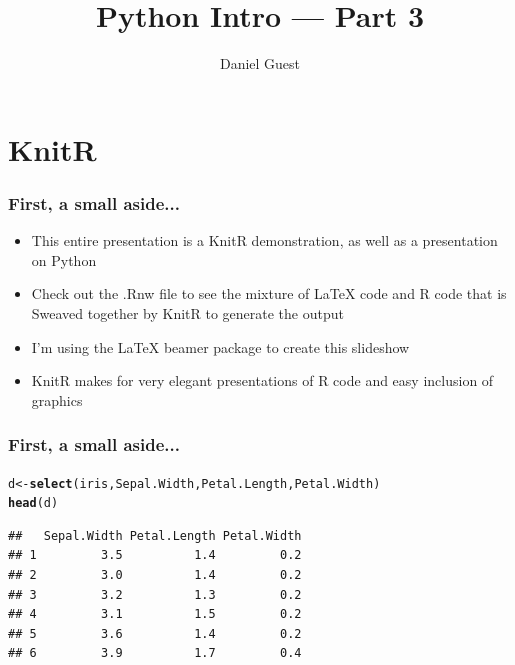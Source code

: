 \documentclass{beamer}\usepackage[]{graphicx}\usepackage[]{color}
\title{Python Intro --- Part 3}
\author{Daniel Guest}
\makeatletter
\newcommand{\hlstd}[1]{\textcolor[rgb]{0.345,0.345,0.345}{#1}}%
\newcommand{\hlkwb}[1]{\textcolor[rgb]{0.69,0.353,0.396}{#1}}%
\newcommand{\hlkwd}[1]{\textcolor[rgb]{0.737,0.353,0.396}{\textbf{#1}}}%
\newenvironment{kframe}{%
 \def\at@end@of@kframe{}%
 \ifinner\ifhmode%
  \def\at@end@of@kframe{\end{minipage}}%
  \begin{minipage}{\columnwidth}%
 \fi\fi%
 \def\FrameCommand##1{\hskip\@totalleftmargin \hskip-\fboxsep
 \colorbox{shadecolor}{##1}\hskip-\fboxsep
     \hskip-\linewidth \hskip-\@totalleftmargin \hskip\columnwidth}%
 \MakeFramed {\advance\hsize-\width
   \@totalleftmargin\z@ \linewidth\hsize
   \@setminipage}}%
 {\par\unskip\endMakeFramed%
 \at@end@of@kframe}
\newenvironment{knitrout}{}{} %
\makeatother
\begin{document}
\maketitle

\tableofcontents

\section{KnitR}

\begin{frame}[fragile]
\frametitle{First, a small aside...}
\begin{itemize}
	\item This entire presentation is a KnitR demonstration, as well as a presentation on Python

	\item Check out the .Rnw file to see the mixture of \LaTeX{} code and R code that is Sweaved together by KnitR to generate the output
	
	\item I'm using the \LaTeX{} beamer package to create this slideshow

	\item KnitR makes for very elegant presentations of R code and easy inclusion of graphics
\end{itemize}
\end{frame}

\begin{frame}[fragile]
\frametitle{First, a small aside...}


\begin{knitrout}
\color{fgcolor}\begin{kframe}
\begin{alltt}
\hlstd{d} \hlkwb{<-} \hlkwd{select}\hlstd{(iris, Sepal.Width, Petal.Length, Petal.Width)}
\hlkwd{head}\hlstd{(d)}
\end{alltt}
\begin{verbatim}
##   Sepal.Width Petal.Length Petal.Width
## 1         3.5          1.4         0.2
## 2         3.0          1.4         0.2
## 3         3.2          1.3         0.2
## 4         3.1          1.5         0.2
## 5         3.6          1.4         0.2
## 6         3.9          1.7         0.4
\end{verbatim}
\end{kframe}
\end{knitrout}
\end{frame}
\end{document}
